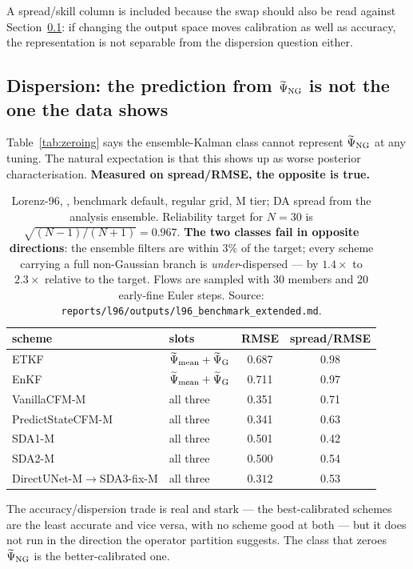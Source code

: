 A spread/skill column is included because the swap should also be read against
Section~\ref{sec:nongaussian}: if changing the output space moves calibration as
well as accuracy, the representation is not separable from the dispersion
question either.

\subsection{Dispersion: the prediction from \texorpdfstring{$\widetilde{\Psi}_{\mathrm{NG}}$}{Psi-NG} is
not the one the data shows}
\label{sec:nongaussian}

Table~\ref{tab:zeroing} says the ensemble-Kalman class cannot represent $\widetilde{\Psi}_{\mathrm{NG}}$
at any tuning. The natural expectation is that this shows up as worse posterior
characterisation. \textbf{Measured on spread/RMSE, the opposite is true.}

\begin{table}[t]
\centering
\small
\begin{tabular}{@{}llcc@{}}
\toprule
\textbf{scheme} & \textbf{slots} & \textbf{\Sz{} RMSE} & \textbf{spread/RMSE} \\
\midrule
ETKF              & $\widetilde{\Psi}_{\mathrm{mean}} + \widetilde{\Psi}_{\mathrm{G}}$ & 0.687 & $\mathbf{0.98}$ \\
EnKF              & $\widetilde{\Psi}_{\mathrm{mean}} + \widetilde{\Psi}_{\mathrm{G}}$ & 0.711 & $\mathbf{0.97}$ \\
\addlinespace
VanillaCFM-M      & all three & 0.351 & 0.71 \\
PredictStateCFM-M & all three & 0.341 & 0.63 \\
SDA1-M            & all three & 0.501 & 0.42 \\
SDA2-M            & all three & 0.500 & 0.54 \\
DirectUNet-M$\to$SDA3-fix-M & all three & $\mathbf{0.312}$ & 0.53 \\
\bottomrule
\end{tabular}
\caption{Lorenz-96, \Sz{}, benchmark default, regular grid, M tier; DA spread
from the analysis ensemble. Reliability target for $N=30$ is
$\sqrt{(N-1)/(N+1)} = 0.967$. \textbf{The two classes fail in opposite
directions}: the ensemble filters are within $3\%$ of the target; every scheme
carrying a full non-Gaussian branch is \emph{under}-dispersed --- by $1.4\times$
to $2.3\times$ relative to the target. Flows are sampled with 30 members and 20
early-fine Euler steps. Source:
\texttt{reports/l96/outputs/l96\_benchmark\_extended.md}.}
\label{tab:calibration}
\end{table}

The accuracy/dispersion trade is real and stark --- the best-calibrated schemes
are the least accurate and vice versa, with no scheme good at both --- but it
does not run in the direction the operator partition suggests. The class that
zeroes $\widetilde{\Psi}_{\mathrm{NG}}$ is the better-calibrated one.

